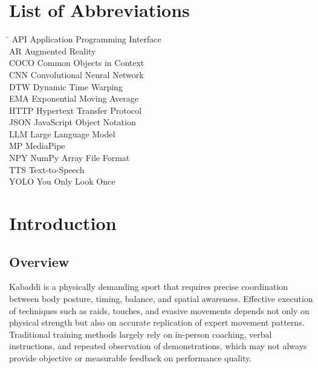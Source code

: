 \documentclass[12pt, a4paper]{report}
\begin{document}
\newpage
\chapter*{List of Abbreviations}

\begin{tabbing}
\hspace{4cm} \= \kill
API \> Application Programming Interface \\[6pt]
AR \> Augmented Reality \\[6pt]
COCO \> Common Objects in Context \\[6pt]
CNN \> Convolutional Neural Network \\[6pt]
DTW \> Dynamic Time Warping \\[6pt]
EMA \> Exponential Moving Average \\[6pt]
HTTP \> Hypertext Transfer Protocol \\[6pt]
JSON \> JavaScript Object Notation \\[6pt]
LLM \> Large Language Model \\[6pt]
MP \> MediaPipe \\[6pt]
NPY \> NumPy Array File Format \\[6pt]
TTS \> Text-to-Speech \\[6pt]
YOLO \> You Only Look Once \\
\end{tabbing}

\newpage
{}
\chapter{Introduction}

\section{Overview}
Kabaddi is a physically demanding sport that requires precise coordination between body posture, timing, balance, and spatial awareness. Effective execution of techniques such as raids, touches, and evasive movements depends not only on physical strength but also on accurate replication of expert movement patterns. Traditional training methods largely rely on in-person coaching, verbal instructions, and repeated observation of demonstrations, which may not always provide objective or measurable feedback on performance quality.
\end{document}
